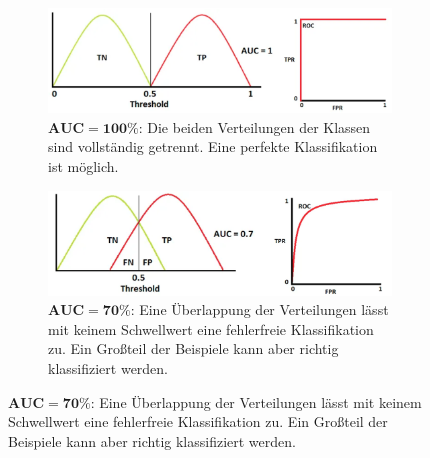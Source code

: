 \begin{figure}[h]
  \centering
  \begin{subfigure}[b]{\thiswidth}
      \includegraphics[width=\linewidth]{bilder/auc_1.png}
      \caption{$\mathbf{AUC = \num{100}\%}$: Die beiden Verteilungen der Klassen sind vollständig getrennt. Eine perfekte Klassifikation ist möglich.}
      \label{fig:subfig1}
  \end{subfigure}
  \hfill
  \begin{subfigure}[b]{\thiswidth}
      \includegraphics[width=\linewidth]{bilder/auc_07.png}
      \caption{$\mathbf{AUC = \num{70}\%}$: Eine Überlappung der Verteilungen lässt mit keinem Schwellwert eine fehlerfreie Klassifikation zu. Ein Großteil der Beispiele kann aber richtig klassifiziert werden.}
      \label{fig:subfig2}
  \end{subfigure}
  

\end{figure}
